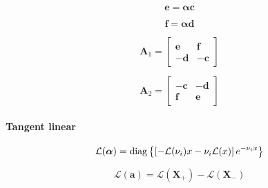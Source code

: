\begin{equation}
\mathbf{e} = \boldsymbol{\alpha}\mathbf{c}
\label{eq:mem-layer_quantities-homogeneous_solution-forward-e}
\end{equation}

\begin{equation}
\mathbf{f} = \boldsymbol{\alpha}\mathbf{d}
\label{eq:mem-layer_quantities-homogeneous_solution-forward-f}
\end{equation}

\begin{equation}
\mathbf{A}_{1} =
\left[
\begin{array}{rr}
 \mathbf{e} &  \mathbf{f} \\
-\mathbf{d} & -\mathbf{c}
\end{array}
\right]
\label{eq:mem-layer_quantities-homogeneous_solution-forward-A1}
\end{equation}

\begin{equation}
\mathbf{A}_{2} =
\left[
\begin{array}{rr}
-\mathbf{c} & -\mathbf{d} \\
 \mathbf{f} &  \mathbf{e}
\end{array}
\right]
\label{eq:mem-layer_quantities-homogeneous_solution-forward-A2}
\end{equation}


%
\paragraph{Tangent linear}
\label{sec:mem-layer_quantities-homogeneous_solution-tangent_linear}

\begin{equation}
\mathcal{L}(\boldsymbol{\alpha}) = \mathrm{diag}\left\{\left[-\mathcal{L}(\nu_{i})x -\nu_{i}\mathcal{L}(x)\right] e^{-\nu_{i}x}\right\}
\label{eq:mem-layer_quantities-homogeneous_solution-tangent_linear-alpha_l}
\end{equation}

\begin{equation}
\mathcal{L}(\mathbf{a}) = \mathcal{L}(\mathbf{X}_{+}) - \mathcal{L}(\mathbf{X}_{-})
\label{eq:mem-layer_quantities-homogeneous_solution-tangent_linear-a_l}
\end{equation}

